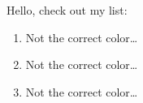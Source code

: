\documentclass{amsart}
\begin{document}
\begin{thm}
	Hello, check out my list:
	\begin{enumerate}
		\item Not the correct color\dots
		\item Not the correct color\dots
		\item Not the correct color\dots
	\end{enumerate}
\end{thm}
\end{document}
